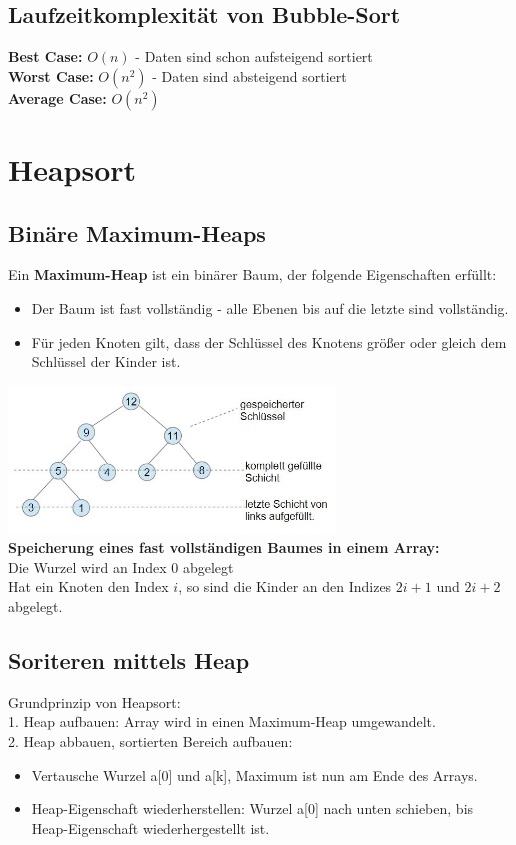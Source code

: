 \documentclass{scrreprt}
\begin{document}
\subsection{Laufzeitkomplexität von Bubble-Sort}
\textbf{Best Case:} $O(n)$ - Daten sind schon aufsteigend sortiert
\\\textbf{Worst Case:} $O(n^2)$ - Daten sind absteigend sortiert
\\\textbf{Average Case:} $O(n^2)$
\section{Heapsort}
\subsection{Binäre Maximum-Heaps}
Ein \textbf{Maximum-Heap} ist ein binärer Baum, der folgende Eigenschaften erfüllt:
\begin{itemize}
  \item Der Baum ist fast vollständig - alle Ebenen bis auf die letzte sind vollständig.
  \item Für jeden Knoten gilt, dass der Schlüssel des Knotens größer oder gleich dem Schlüssel der Kinder ist.
\end{itemize}
\includegraphics[width=0.65\textwidth]{graphics/maximum-heap}
\\\textbf{Speicherung eines fast vollständigen Baumes in einem Array:}
\\Die Wurzel wird an Index 0 abgelegt
\\Hat ein Knoten den Index $i$, so sind die Kinder an den Indizes $2i+1$ und $2i+2$ abgelegt.
\subsection{Soriteren mittels Heap}
Grundprinzip von Heapsort:
\\1. Heap aufbauen: Array wird in einen Maximum-Heap umgewandelt.
\\2. Heap abbauen, sortierten Bereich aufbauen:
\begin{itemize}
  \item Vertausche Wurzel a[0] und a[k], Maximum ist nun am Ende des Arrays.
  \item Heap-Eigenschaft wiederherstellen: Wurzel a[0] nach unten schieben, bis Heap-Eigenschaft 
  wiederhergestellt ist.
\end{itemize}
\end{document}
